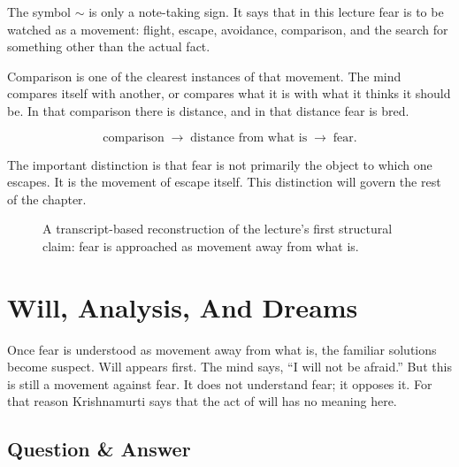 The symbol \(\sim\) is only a note-taking sign. It says that in this lecture fear is to be watched as a movement: flight, escape, avoidance, comparison, and the search for something other than the actual fact.

Comparison is one of the clearest instances of that movement. The mind compares itself with another, or compares what it is with what it thinks it should be. In that comparison there is distance, and in that distance fear is bred.

\begin{equation}
\text{comparison}
\;\longrightarrow\;
\text{distance from what is}
\;\longrightarrow\;
\text{fear}.
\end{equation}

The important distinction is that fear is not primarily the object to which one escapes. It is the movement of escape itself. This distinction will govern the rest of the chapter.

\begin{figure}
\centering
{}
\caption{A transcript-based reconstruction of the lecture's first structural claim: fear is approached as movement away from what is.}
\end{figure}

\section{Will, Analysis, And Dreams}

Once fear is understood as movement away from what is, the familiar solutions become suspect. Will appears first. The mind says, ``I will not be afraid.'' But this is still a movement against fear. It does not understand fear; it opposes it. For that reason Krishnamurti says that the act of will has no meaning here.

\subsection{Question \& Answer}

